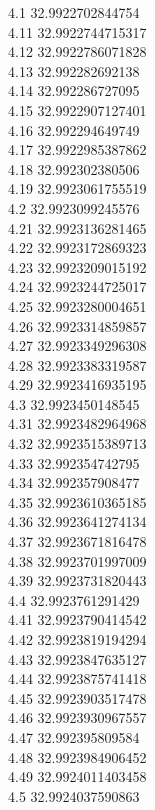 {4.1	32.9922702844754\\
4.11	32.9922744715317\\
4.12	32.9922786071828\\
4.13	32.992282692138\\
4.14	32.992286727095\\
4.15	32.9922907127401\\
4.16	32.992294649749\\
4.17	32.9922985387862\\
4.18	32.992302380506\\
4.19	32.9923061755519\\
4.2	32.9923099245576\\
4.21	32.9923136281465\\
4.22	32.9923172869323\\
4.23	32.9923209015192\\
4.24	32.9923244725017\\
4.25	32.9923280004651\\
4.26	32.9923314859857\\
4.27	32.9923349296308\\
4.28	32.9923383319587\\
4.29	32.9923416935195\\
4.3	32.9923450148545\\
4.31	32.9923482964968\\
4.32	32.9923515389713\\
4.33	32.992354742795\\
4.34	32.992357908477\\
4.35	32.9923610365185\\
4.36	32.9923641274134\\
4.37	32.9923671816478\\
4.38	32.9923701997009\\
4.39	32.9923731820443\\
4.4	32.9923761291429\\
4.41	32.9923790414542\\
4.42	32.9923819194294\\
4.43	32.9923847635127\\
4.44	32.9923875741418\\
4.45	32.9923903517478\\
4.46	32.9923930967557\\
4.47	32.992395809584\\
4.48	32.9923984906452\\
4.49	32.9924011403458\\
4.5	32.9924037590863\\
}
